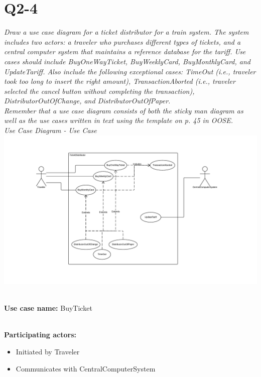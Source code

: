 \section{Q2-4}
\emph{Draw a use case diagram for a ticket distributor for a train system. The system includes two actors: a traveler who purchases different types of tickets, and a central computer system that maintains a reference database for the tariff. Use cases should include
BuyOneWayTicket, BuyWeeklyCard, BuyMonthlyCard, and UpdateTariff. Also include the following exceptional cases: TimeOut (i.e., traveler took too long to insert the right amount), TransactionAborted (i.e., traveler selected the cancel button without completing the transaction), DistributorOutOfChange, and DistributorOutOfPaper.}
\\
\emph{Remember that a use case diagram consists of both the sticky man diagram as well as the use cases written in text using the template on p. 45 in OOSE. }
\\
\emph{Use Case Diagram - Use Case}
\\
\includegraphics[scale=0.3]{Assignment-36-Use-Case-Diagram-Use-Case}

\HRule \\[0.4cm]

\textbf{Use case name:} BuyTicket

\HRule \\[0.4cm]

\textbf{Participating actors:}
\begin{itemize}
	\item Initiated by Traveler
	\item Communicates with CentralComputerSystem
\end{itemize}

\HRule \\[0.4cm]

